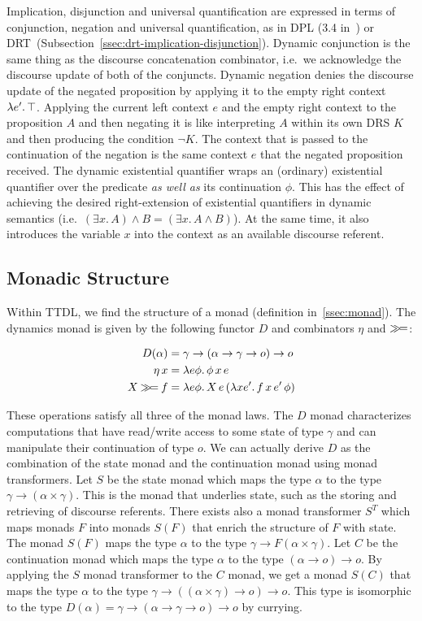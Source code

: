 Implication, disjunction and universal quantification are expressed in
terms of conjunction, negation and universal quantification, as in DPL (3.4
in~\cite{groenendijk1991dynamic}) or
DRT~(Subsection~\ref{ssec:drt-implication-disjunction}). Dynamic
conjunction is the same thing as the discourse concatenation combinator,
i.e.\ we acknowledge the discourse update of both of the conjuncts. Dynamic
negation denies the discourse update of the negated proposition by applying
it to the empty right context $\lambda e'.\, \top$. Applying the current left
context $e$ and the empty right context to the proposition $A$ and then
negating it is like interpreting $A$ within its own DRS $K$ and then
producing the condition $\lnot K$. The context that is passed to the
continuation of the negation is the same context $e$ that the negated
proposition received. The dynamic existential quantifier wraps an
(ordinary) existential quantifier over the predicate \emph{as well as} its
continuation $\phi$. This has the effect of achieving the desired
right-extension of existential quantifiers in dynamic semantics (i.e.\
$(\exists x.\, A) \land B = (\exists x.\, A \land B)$). At the same time,
it also introduces the variable $x$ into the context as an available
discourse referent.


\subsection{Monadic Structure}
\label{ssec:ttdl-monadic-structure}

Within TTDL, we find the structure of a monad (definition
in~\ref{ssec:monad}). The dynamics monad is given by the following functor
$D$ and combinators $\eta$ and $\mathbin{\gg\!=}$:

\begin{align*}
  D(\alpha) &= \gamma \to (\alpha \to \gamma \to o) \to o \\
  \eta\,x &= \lambda e \phi.\, \phi\,x\,e \\
  X \mathbin{\gg\!=} f &= \lambda e \phi.\, X\,e\,(\lambda x e'.\, f\,x\,e'\,\phi)
\end{align*}

These operations satisfy all three of the monad laws. The $D$ monad
characterizes computations that have read/write access to some state of
type $\gamma$ and can manipulate their continuation of type $o$. We can
actually derive $D$ as the combination of the state monad and the
continuation monad using monad transformers. Let $S$ be the state monad
which maps the type $\alpha$ to the type
$\gamma \to (\alpha \times \gamma)$. This is the monad that underlies
state, such as the storing and retrieving of discourse referents. There
exists also a monad transformer $S^T$ which maps monads $F$ into monads
$S(F)$ that enrich the structure of $F$ with state. The monad $S(F)$ maps
the type $\alpha$ to the type $\gamma \to F(\alpha \times \gamma)$. Let $C$
be the continuation monad which maps the type $\alpha$ to the type
$(\alpha \to o) \to o$. By applying the $S$ monad transformer to the $C$
monad, we get a monad $S(C)$ that maps the type $\alpha$ to the type
$\gamma \to ((\alpha \times \gamma) \to o) \to o$. This type is isomorphic
to the type $D(\alpha) = \gamma \to (\alpha \to \gamma \to o) \to o$ by
currying.


